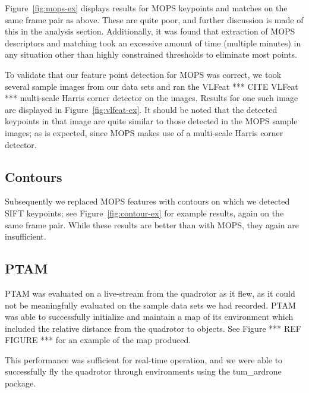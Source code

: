 \documentclass{acmsiggraph}
\begin{document}
Figure~\ref{fig:mops-ex} displays results for MOPS keypoints and matches on the same frame pair as above. These are quite poor, and further discussion is made of this in the analysis section. Additionally, it was found that extraction of MOPS descriptors and matching took an excessive amount of time (multiple minutes) in any situation other than highly constrained thresholds to eliminate most points.

To validate that our feature point detection for MOPS was correct, we took several sample images from our data sets and ran the VLFeat *** CITE VLFeat *** multi-scale Harris corner detector on the images. Results for one such image are displayed in Figure~\ref{fig:vlfeat-ex}. It should be noted that the detected keypoints in that image are quite similar to those detected in the MOPS sample images; as is expected, since MOPS makes use of a multi-scale Harris corner detector.

\subsection{Contours}
Subsequently we replaced MOPS features with contours on which we detected SIFT keypoints; see Figure~\ref{fig:contour-ex} for example results, again on the same frame pair. While these results are better than with MOPS, they again are insufficient.

\subsection{PTAM}
PTAM was evaluated on a live-stream from the quadrotor as it flew, as it could not be meaningfully evaluated on the sample data sets we had recorded. PTAM was able to successfully initialize and maintain a map of its environment which included the relative distance from the quadrotor to objects. See Figure *** REF FIGURE *** for an example of the map produced.

This performance was sufficient for real-time operation, and we were able to successfully fly the quadrotor through environments using the tum\_ardrone package.
\end{document}
